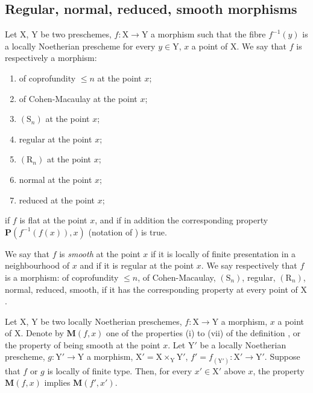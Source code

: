 \subsection{Regular, normal, reduced, smooth morphisms}
\label{subsection:IV.6.8}

\begin{definition}[6.8.1]
\label{IV.6.8.1}
Let $\mathrm{X}$, $\mathrm{Y}$ be two preschemes, $f:\mathrm{X}\to\mathrm{Y}$ a morphism such that the fibre $f^{-1}(y)$ is a locally Noetherian prescheme for every $y\in\mathrm{Y}$, $x$ a point of $\mathrm{X}$. We say that $f$ is respectively a morphism:
\begin{enumerate}[label=(\roman*)]
  \item of coprofundity $\leqslant n$ at the point $x$;
  \item of Cohen-Macaulay at the point $x$;
  \item $(\mathrm{S}_n)$ at the point $x$;
  \item regular at the point $x$;
  \item $(\mathrm{R}_n)$ at the point $x$;
  \item normal at the point $x$;
  \item reduced at the point $x$;
\end{enumerate}
if $f$ is flat at the point $x$, and if in addition the corresponding property $\boldsymbol{P}(f^{-1}(f(x)),x)$ \textnormal{(}notation of \textnormal{)} is true.

We say that $f$ is \emph{smooth} at the point $x$ if it is locally of finite presentation in a neighbourhood of $x$ and if it is regular at the point $x$. We say respectively that $f$ is a morphism: of coprofundity $\leqslant n$, of Cohen-Macaulay, $(\mathrm{S}_n)$, regular, $(\mathrm{R}_n)$, normal, reduced, smooth, if it has the corresponding property at every point of $\mathrm{X}$.
\end{definition}

\begin{proposition}[6.8.2]
\label{IV.6.8.2}
Let $\mathrm{X}$, $\mathrm{Y}$ be two locally Noetherian preschemes, $f:\mathrm{X}\to\mathrm{Y}$ a morphism, $x$ a point of $\mathrm{X}$. Denote by $\boldsymbol{M}(f,x)$ one of the properties (i) to (vii) of the definition , or the property of being smooth at the point $x$. Let $\mathrm{Y}'$ be a locally Noetherian prescheme, $g:\mathrm{Y}'\to\mathrm{Y}$ a morphism, $\mathrm{X}'=\mathrm{X}\times_\mathrm{Y}\mathrm{Y}'$, $f'=f_{(\mathrm{Y}')}:\mathrm{X}'\to\mathrm{Y}'$. Suppose that $f$ or $g$ is locally of finite type. Then, for every $x'\in\mathrm{X}'$ above $x$, the property $\boldsymbol{M}(f,x)$ implies $\boldsymbol{M}(f',x')$.
\end{proposition}

